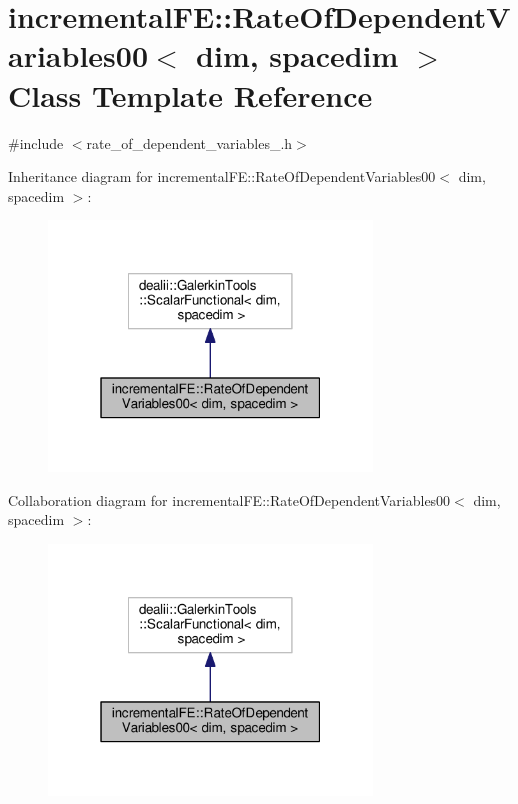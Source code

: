 \hypertarget{classincremental_f_e_1_1_rate_of_dependent_variables00}{}\section{incremental\+FE\+:\+:Rate\+Of\+Dependent\+Variables00$<$ dim, spacedim $>$ Class Template Reference}
\label{classincremental_f_e_1_1_rate_of_dependent_variables00}


{\ttfamily \#include $<$rate\+\_\+of\+\_\+dependent\+\_\+variables\+\_.\+h$>$}



Inheritance diagram for incremental\+FE\+:\+:Rate\+Of\+Dependent\+Variables00$<$ dim, spacedim $>$\+:\nopagebreak
\begin{figure}[H]
\begin{center}
\leavevmode
\includegraphics[width=244pt]{classincremental_f_e_1_1_rate_of_dependent_variables00__inherit__graph}
\end{center}
\end{figure}


Collaboration diagram for incremental\+FE\+:\+:Rate\+Of\+Dependent\+Variables00$<$ dim, spacedim $>$\+:\nopagebreak
\begin{figure}[H]
\begin{center}
\leavevmode
\includegraphics[width=244pt]{classincremental_f_e_1_1_rate_of_dependent_variables00__coll__graph}
\end{center}
\end{figure}

